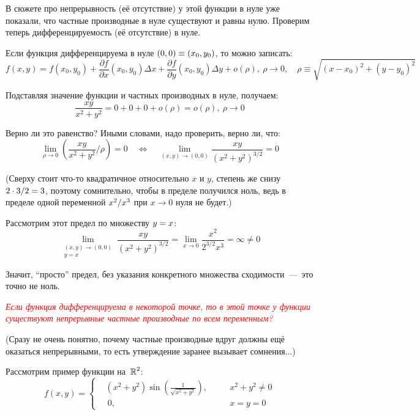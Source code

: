 \documentclass[a4paper,12pt]{article}
\begin{document}
\begin{solution}
    В сюжете про непрерывность (её отсутствие) у этой функции в нуле уже показали, что частные производные в нуле существуют и равны нулю.
    Проверим теперь дифференцируемость (её отсутствие) в нуле.

    Если функция дифференцируема в нуле $(0, 0) \hm\equiv (x_0, y_0)$, то можно записать:
    \[
      f(x, y) = f(x_0, y_0) + \frac{\partial f}{\partial x}(x_0, y_0) \Delta x + \frac{\partial f}{\partial y}(x_0, y_0) \Delta y + o(\rho),\ \rho \to 0,\quad \rho \equiv \sqrt{(x - x_0)^2 + (y - y_0)^2}
    \]

    Подставляя значение функции и частных производных в нуле, получаем:
    \[
      \frac{xy}{x^2 + y^2} = 0 + 0 + 0 + o(\rho) = o(\rho),\ \rho \to 0
    \]

    Верно ли это равенство?
    Иными словами, надо проверить, верно ли, что:
    \[
      \lim_{\rho \to 0} \left(\frac{xy}{x^2 + y^2} \Big/ \rho\right) = 0 \quad \Leftrightarrow \quad \lim_{(x, y) \to (0, 0)} \frac{xy}{(x^2 + y^2)^{3/2}} = 0
    \]

    (Сверху стоит что-то квадратичное относительно $x$ и $y$, степень же снизу $2 \hm\cdot 3 \hm/ 2 \hm= 3$, поэтому сомнительно, чтобы в пределе получился ноль, ведь в пределе одной переменной $x^2 \hm/ x^3$ при $x \to 0$ нуля не будет.)

    Рассмотрим этот предел по множеству $y \hm= x$:
    \[
      \lim_{\substack{(x, y) \to (0, 0) \\ y = x}} \frac{xy}{(x^2 + y^2)^{3/2}} = \lim_{x \to 0} \frac{x^2}{2^{3/2} x^3} = \infty \not= 0
    \]

    Значит, ``просто'' предел, без указания конкретного множества сходимости~---~это точно не ноль.

    \medskip
    
    \textcolor{red}{\emph{
      Если функция дифференцируема в некоторой точке, то в этой точке у функции существуют \emph{непрерывные} частные производные по всем переменным?
    }}

    (Сразу не очень понятно, почему частные производные вдруг должны ещё оказаться непрерывными, то есть утверждение заранее вызывает сомнения...)

    Рассмотрим пример функции на~$\operatorname{\mathbb R}^2$:
    \begin{equation}\label{eq:example-diff-not-cont-partial}
        f(x, y) = \left\{
          \begin{alignedat}{2}
            &(x^2 + y^2) \sin\left(\frac{1}{\sqrt{x^2 + y^2}}\right),\quad & &x^2 + y^2 \not= 0\\
            &\ 0,\quad & &x = y = 0
          \end{alignedat}
        \right.
    \end{equation}


\end{solution}
\end{document}
